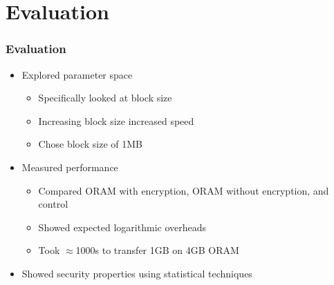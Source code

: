 \documentclass{beamer}
\begin{document}
\section{Evaluation}

\begin{frame}
    \frametitle{Evaluation}
    \begin{itemize}
        \item Explored parameter space
            \begin{itemize}
                \item Specifically looked at block size
                \item Increasing block size increased speed
                \item Chose block size of 1MB
            \end{itemize}
        \item Measured performance
            \begin{itemize}
                \item Compared ORAM with encryption, ORAM without encryption, and control
                \item Showed expected logarithmic overheads
                \item Took $\approx$1000s to transfer 1GB on 4GB ORAM
            \end{itemize}
        \item Showed security properties using statistical techniques
    \end{itemize}
\end{frame}

\end{document}

